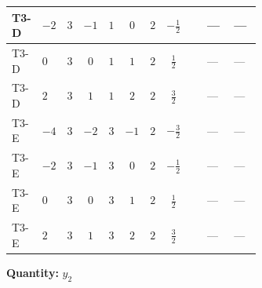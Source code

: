 \documentclass[8pt]{article}
\begin{document}
\begin{landscape}
\begin{longtable}{@{}llcccccc >{\raggedright\arraybackslash}p{0.21\linewidth} >{\raggedright\arraybackslash}p{0.21\linewidth} >{\raggedright\arraybackslash}p{0.21\linewidth}@{}}
\midrule
T3-D & $-2$ & $3$ & $-1$ & $1$ & $0$ & $2$ & $-\frac{1}{2}$ & \scriptsize\adjustbox{max width=\linewidth}{$\begin{gathered} -\frac{3}{2} {g_1}^2 \left({y_2}\right)_{ij}\end{gathered}$} & --- & --- \\
\midrule
T3-D & $0$ & $3$ & $0$ & $1$ & $1$ & $2$ & $\frac{1}{2}$ & \scriptsize\adjustbox{max width=\linewidth}{$\begin{gathered} -\frac{3}{2} {g_1}^2 \left({y_2}\right)_{ij}\end{gathered}$} & --- & --- \\
\midrule
T3-D & $2$ & $3$ & $1$ & $1$ & $2$ & $2$ & $\frac{3}{2}$ & \scriptsize\adjustbox{max width=\linewidth}{$\begin{gathered} -\frac{15}{2} {g_1}^2 \left({y_2}\right)_{ij}\end{gathered}$} & --- & --- \\
\midrule
T3-E & $-4$ & $3$ & $-2$ & $3$ & $-1$ & $2$ & $-\frac{3}{2}$ & \scriptsize\adjustbox{max width=\linewidth}{$\begin{gathered} -\frac{15}{2} {g_1}^2 \left({y_2}\right)_{ij}\end{gathered}$} & --- & --- \\
\midrule
T3-E & $-2$ & $3$ & $-1$ & $3$ & $0$ & $2$ & $-\frac{1}{2}$ & \scriptsize\adjustbox{max width=\linewidth}{$\begin{gathered} -\frac{3}{2} {g_1}^2 \left({y_2}\right)_{ij}\end{gathered}$} & --- & --- \\
\midrule
T3-E & $0$ & $3$ & $0$ & $3$ & $1$ & $2$ & $\frac{1}{2}$ & \scriptsize\adjustbox{max width=\linewidth}{$\begin{gathered} -\frac{3}{2} {g_1}^2 \left({y_2}\right)_{ij}\end{gathered}$} & --- & --- \\
\midrule
T3-E & $2$ & $3$ & $1$ & $3$ & $2$ & $2$ & $\frac{3}{2}$ & \scriptsize\adjustbox{max width=\linewidth}{$\begin{gathered} -\frac{15}{2} {g_1}^2 \left({y_2}\right)_{ij}\end{gathered}$} & --- & --- \\
\midrule
\bottomrule
\end{longtable}
\clearpage
\noindent\textbf{Quantity: }$y_2$\par\smallskip

\end{landscape}
\end{document}
